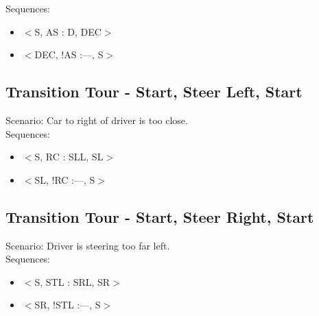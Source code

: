 \documentclass[10pt,letterpaper]{article}
\begin{document}
Sequences:
\begin{itemize}
	\item{$<$S, AS : D, DEC$>$}
	\item{$<$DEC, !AS :—, S$>$}
\end{itemize}

\subsection{Transition Tour - Start, Steer Left, Start}
Scenario: Car to right of driver is too close.\\

Sequences:
\begin{itemize}
	\item{$<$S, RC : SLL, SL$>$}
	\item{$<$SL, !RC :—, S$>$}
\end{itemize}

\subsection{Transition Tour - Start, Steer Right, Start}
Scenario: Driver is steering too far left.\\

Sequences:
\begin{itemize}
	\item{$<$S,  STL : SRL, SR$>$}
	\item{$<$SR, !STL :—, S$>$}
\end{itemize}
\end{document}
